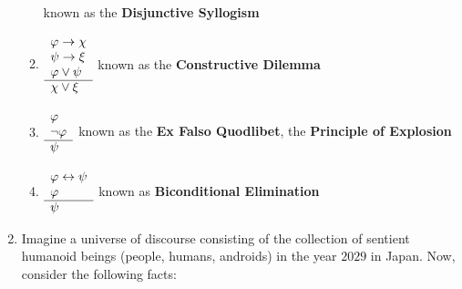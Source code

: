 \begin{enumerate}
\begin{enumerate}
                \)
                \hfill known as the \textbf{Disjunctive Syllogism}
            \item
                \(
                    \begin{array}{l}
                        \varphi \rightarrow \chi \\
                        \psi \rightarrow \xi \\
                        \varphi \join \psi \\
                        \cline{1-1}
                        \chi \join \xi
                    \end{array}
                \)
                \hfill known as the \textbf{Constructive Dilemma}
            \item
                \(
                    \begin{array}{l}
                        \varphi \\
                        \neg \varphi \\
                        \cline{1-1}
                        \psi
                    \end{array}
                \)
                \hfill known as the \textbf{Ex Falso Quodlibet}, \aka the \textbf{Principle of Explosion}
            \item
                \(
                    \begin{array}{l}
                        \varphi \leftrightarrow \psi \\
                        \varphi \\
                        \cline{1-1}
                        \psi
                    \end{array}
                \)
                \hfill known as \textbf{Biconditional Elimination}
        \end{enumerate}
    \item
        Imagine a universe of discourse consisting of the collection of sentient humanoid beings
        (\eg people, humans, androids) in the year \(2029\) in Japan.
        Now, consider the following facts:


\end{enumerate}
